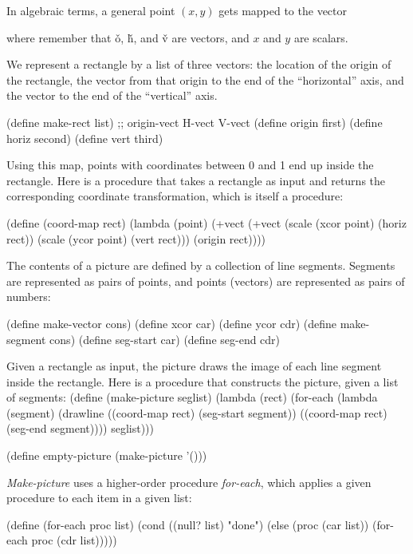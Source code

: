 In algebraic terms, a general point $(x,y)$
gets mapped to the vector


where remember that \v{o}, \v{h}, and \v{v} are vectors, and $x$ and $y$
are scalars.

\vpar
We represent a rectangle by a list of three vectors: the location of the
origin of the rectangle, the vector from that origin to the end of the
``horizontal'' axis, and the vector to the end of the ``vertical'' axis.

\beginlisp
(define make-rect list)             ;; origin-vect H-vect V-vect
(define origin first)
(define horiz second)
(define vert third)
\endlisp
        
Using this map, points with coordinates between 0 and 1 end up inside
the rectangle.  Here is a procedure that takes a rectangle as input
and returns the corresponding coordinate transformation, which is itself
a procedure: 

\beginlisp
(define (coord-map rect)
  (lambda (point)
    (+vect
     (+vect (scale (xcor point)
                   (horiz rect))
            (scale (ycor point)
                   (vert rect)))
     (origin rect))))

\endlisp

The contents of a picture are defined by a
collection of line segments.
Segments are
represented as pairs of points, and
points (vectors) are represented as pairs of numbers:

\beginlisp
(define make-vector cons)
(define xcor car)
(define ycor cdr)
\pbrk
(define make-segment cons)
(define seg-start car)
(define seg-end cdr)
\endlisp


Given a rectangle as input, the picture
draws the image of each line segment inside the rectangle.  Here is a
procedure that constructs the picture, given a list of segments:
\beginlisp
(define (make-picture seglist)
  (lambda (rect)
    (for-each
     (lambda (segment)
       (drawline ((coord-map rect) (seg-start segment))
                 ((coord-map rect) (seg-end segment))))
     seglist)))

\pbrk
(define empty-picture (make-picture '()))
\endlisp

{\it Make-picture} uses a higher-order procedure {\it for-each}, which applies
a given procedure to each item in a given list:

\beginlisp
(define (for-each proc list)
  (cond ((null? list) "done")
        (else (proc (car list))
              (for-each proc (cdr list)))))
\endlisp

